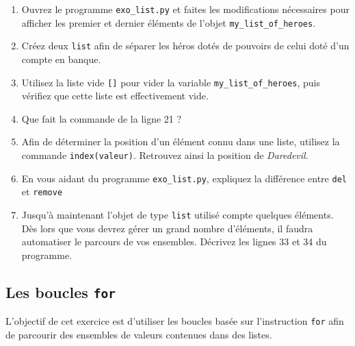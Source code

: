 \begin{enumerate}
\item  Ouvrez   le  programme  \texttt{exo\_list.py}  et   faites  les
  modifications  nécessaires pour  afficher  les premier  et  dernier
  éléments de l'objet \texttt{my\_list\_of\_heroes}.  %
\item  Créez deux  \texttt{list} afin  de séparer  les héros  dotés de
  pouvoirs de celui doté d'un compte en banque.  %
\item  Utilisez  la liste  vide  \texttt{[]}  pour vider  la  variable
  \texttt{my\_list\_of\_heroes},
  puis  vérifiez que  cette liste
  est effectivement vide.  %
\item Que fait la commande de la ligne 21 ?  %
\item  Afin de  déterminer la  position  d'un élément  connu dans  une
  liste, utilisez la commande \texttt{index(valeur)}.  Retrouvez ainsi
  la position de \textit{Daredevil}.

\item En vous aidant  du programme \texttt{exo\_list.py}, expliquez la
  différence entre \texttt{del} et \texttt{remove}

\item Jusqu'à maintenant l'objet de type \texttt{list} utilisé compte quelques
  éléments. Dès lors que vous  devrez gérer un grand nombre d'éléments,
  il faudra  automatiser le parcours  de vos ensembles.   Décrivez les
  lignes 33 et 34 du programme.
\end{enumerate}



\subsection{Les boucles  \texttt{for}}

L'objectif  de cet  exercice est  d'utiliser les  boucles basée sur
l'instruction \texttt{for} afin  de  parcourir  des  ensembles  de
valeurs  contenues  dans  des listes.



